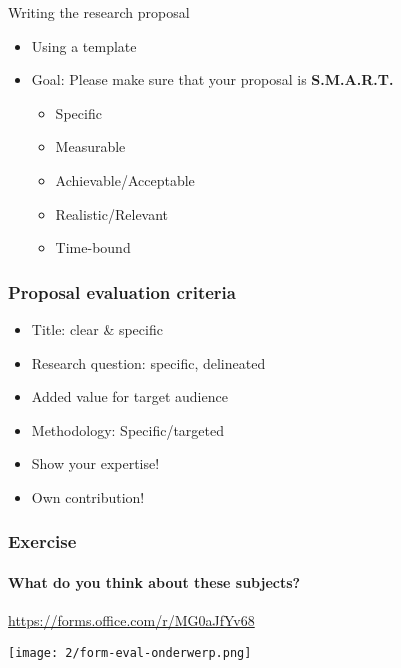 \documentclass[aspectratio=169]{beamer}
\begin{document}
    \begin{frame}{Writing the research proposal}
        
        \begin{itemize}
            \item Using a template
            \item Goal: Please make sure that your proposal is \textbf{S.M.A.R.T.}
            \begin{itemize}
                \item Specific
                \item Measurable
                \item Achievable/Acceptable
                \item Realistic/Relevant
                \item Time-bound
            \end{itemize}
        \end{itemize}
    \end{frame}
    
    \begin{frame}
        \frametitle{Proposal evaluation criteria}
        
        \begin{itemize}
            \item Title: clear \& specific
            \item Research question: specific, delineated
            \item Added value for target audience
            \item Methodology: Specific/targeted
            \item Show your expertise!
            \item Own contribution!
        \end{itemize}
        
    \end{frame}
    
    \begin{frame}
        \frametitle{Exercise}
        \framesubtitle{What do you think about these subjects?}
        
        \centering
        
        \url{https://forms.office.com/r/MG0aJfYv68}
        
        \bigskip
        
        \texttt{[image: 2/form-eval-onderwerp.png]}
        
    \end{frame}
    
\end{document}
